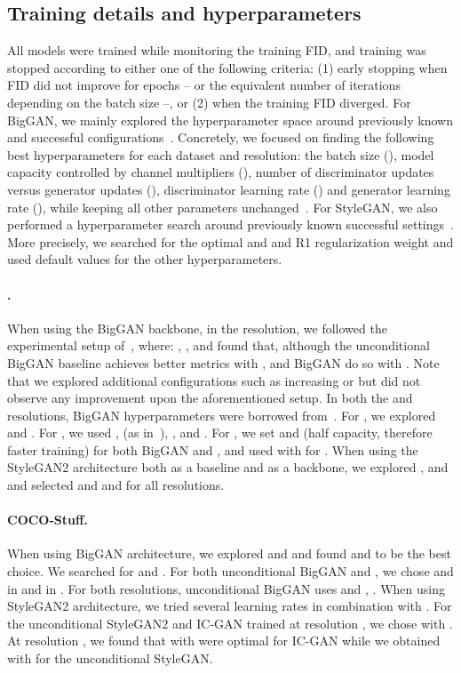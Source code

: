\subsection{Training details and hyperparameters}
\label{subsec:tr_details}
All models were trained while monitoring the training FID, and training was stopped according to either one of the following criteria: (1) early stopping when FID did not improve for  epochs -- or the equivalent number of iterations depending on the batch size --, or (2) when the training FID diverged. For BigGAN, we mainly explored the hyperparameter space around previously known and successful configurations~\cite{brock2018large,noroozi2020self}. Concretely, we focused on finding the following best hyperparameters for each dataset and resolution: the batch size (), model capacity controlled by channel multipliers (), number of discriminator updates versus generator updates (), discriminator learning rate () and generator learning rate (), while keeping all other parameters unchanged~\cite{brock2018large}. For StyleGAN, we also performed a hyperparameter search around previously known successful settings~\cite{karras2020training}. More precisely, we searched for the optimal  and  and R1 regularization weight  and used default values for the other hyperparameters. 


\paragraph{\ImNet.} When using the BigGAN backbone, in the  resolution, we followed the experimental setup of~\cite{noroozi2020self}, where: , ,  and found that, although the unconditional BigGAN baseline achieves better metrics with , \ours and BigGAN do so with . Note that we explored additional configurations such as increasing  or  but did not observe any improvement upon the aforementioned setup. In both the  and  resolutions, BigGAN hyperparameters were borrowed from~\cite{brock2018large}. For \ours, we explored  and . 
For , we used ,  (as in~\cite{brock2018large}), ,  and . 
For , we set  and  (half capacity, therefore faster training) for both BigGAN and \ours, and used  with  for \ours. 
When using the StyleGAN2 architecture both as a baseline and as a backbone, we explored ,  and  and selected  and  and  for all resolutions.

\paragraph{COCO-Stuff.} When using BigGAN architecture, we explored  and   and found  and  to be the best choice. We searched for  and . For both unconditional BigGAN and \ours, we chose  and  in  and  in . 
For both resolutions, unconditional BigGAN uses  and \ours, . When using StyleGAN2 architecture, we tried several learning rates  in combination with . For the unconditional StyleGAN2 and IC-GAN trained at resolution , we chose  with . At resolution , we found that  with  were optimal for IC-GAN while we obtained  with  for the unconditional StyleGAN.  

